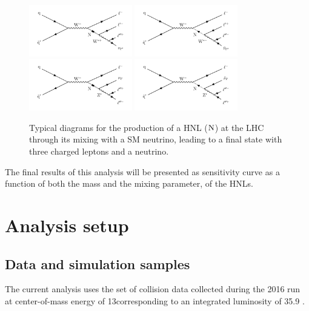 \begin{figure}[h]
\centering
\includegraphics[width=0.4\textwidth]{Figures/c5/hnl_feyn.pdf}
\includegraphics[width=0.4\textwidth]{Figures/c5/hnl_feyn_2.pdf}\\
\includegraphics[width=0.4\textwidth]{Figures/c5/hnl_z_feyn.pdf}
\includegraphics[width=0.4\textwidth]{Figures/c5/hnl_z_feyn_2.pdf}
\caption{Typical diagrams for the production of a HNL ($\mathrm{N}$)  at the LHC \ti
through its mixing with a SM neutrino, leading to a
final state with three charged leptons and a neutrino.}
\label{fig:c5hnldiagram}
\end{figure}

The final results of this analysis will be presented as sensitivity
curve as a function of both the mass and the mixing parameter, \mixpar
of the HNLs. 

\section{Analysis setup}
\subsection{Data and simulation samples}
The current analysis uses the set of \Pp collision data collected during the 2016 run at center-of-mass energy of 13\TeV corresponding to
an integrated luminosity of 35.9 \fbinv. 

